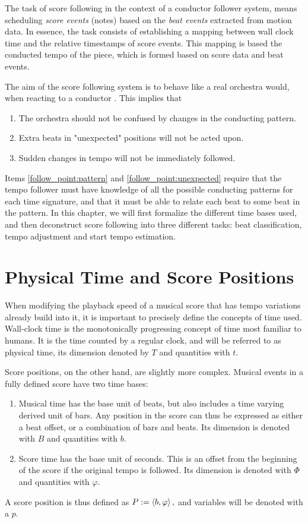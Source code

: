 The task of score following in the context
of a conductor follower system,
means scheduling \textit{score events} (notes)
based on the \textit{beat events} extracted
from motion data.
In essence, the task consists of establishing a mapping between
wall clock time and the relative timestamps of score events.
This mapping is based the conducted tempo of the piece,
which is formed based on score data and beat events.

The aim of the score following system
is to behave like a real orchestra would,
when reacting to a conductor \cite{findsomecites?}.
This implies that
\begin{enumerate}
\item The orchestra should not be confused by changes in the conducting pattern. \label{follow_point:pattern}
\item Extra beats in "unexpected" positions will not be acted upon. \label{follow_point:unexpected}
\item Sudden changes in tempo will not be immediately followed.
\end{enumerate}
Items \ref{follow_point:pattern} and \ref{follow_point:unexpected} require
that the tempo follower must have knowledge of all the possible
conducting patterns for each time signature,
and that it must be able to relate each beat to some beat in the pattern.
In this chapter,
we will first formalize the different time bases used,
and then deconstruct score following into
three different tasks:
beat classification, tempo adjustment and start tempo estimation.

\section{Physical Time and Score Positions}
\label{sec:meth:read_and_score_time}

When modifying the playback speed of a musical score
that has tempo variations already build into it,
it is important to precisely define the concepts of time used.
Wall-clock time is the monotonically progressing concept of time
most familiar to humans.
It is the time counted by a regular clock,
and will be referred to as physical time,
its dimension denoted by $T$ and quantities with $t$.

Score positions, on the other hand,
are slightly more complex.
Musical events in a fully defined score have two time bases:
\begin{enumerate}
\item Musical time has the base unit of beats, but also includes a time varying derived unit of bars. Any position in the score can thus be expressed as either a beat offset, or a combination of bars and beats. Its dimension is denoted with $B$ and quantities with $b$.
\item Score time has the base unit of seconds. This is an offset from the beginning of the score if the original tempo is followed. Its dimension is denoted with $\Phi$ and quantities with $\varphi$.
\end{enumerate}
A score position is thus defined as
$ P := \left \langle b, \varphi \right \rangle , $
and variables will be denoted with a $p$.

